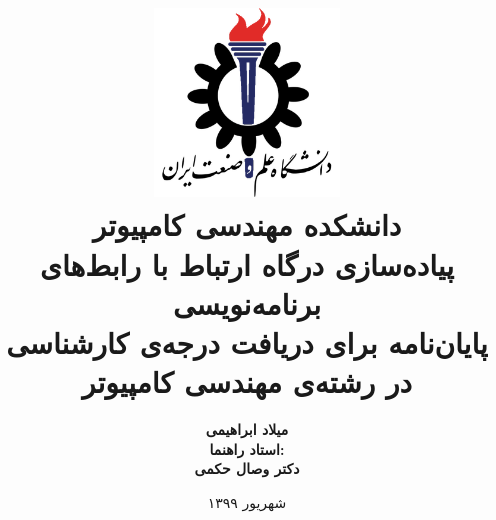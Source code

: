 \title{
    \center
    \includegraphics[width=5cm, height=5cm]{images/IUST_logo_color.png} \\ [10pt]
    دانشکده مهندسی کامپیوتر \\ [70pt]

    \textbf{ پیاده‌سازی درگاه ارتباط با رابط‌های برنامه‌نویسی} \\ [30pt]

    \textbf{ پایان‌نامه برای دریافت درجه‌ی کارشناسی در رشته‌ی مهندسی کامپیوتر} \\ [20pt]

}

\author{
    \textbf{میلاد ابراهیمی} \\ [50pt]


    \textbf{ استاد راهنما:} \\ [10pt]
    \textbf{دکتر وصال حکمی} \\ [10pt]
}



\date{
    شهریور ۱۳۹۹
}

